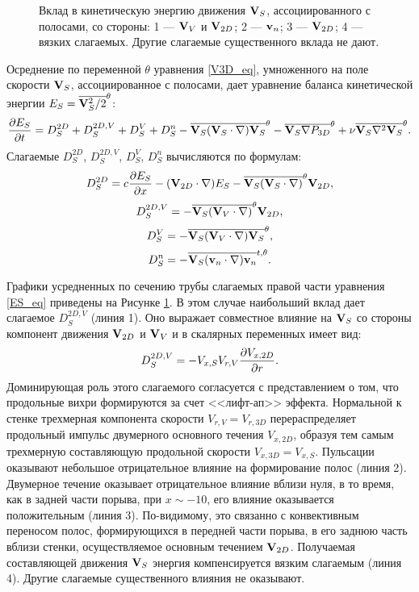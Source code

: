 \begin{figure}
\caption{Вклад в кинетическую энергию движения $\mathbf{V}_S$, ассоциированного с полосами, со стороны: 1 --- $\mathbf{V}_V$ и $\mathbf{V}_{2D}$; 2 --- $\mathbf{v}_n$; 3 --- $\mathbf{V}_{2D}$; 4 --- вязких слагаемых. Другие слагаемые существенного вклада не дают.}
\label{es_parts_pic}
\end{figure}

Осреднение по переменной $\theta$ уравнения \eqref{V3D_eq}, умноженного на поле скорости $\mathbf{V}_S$,  ассоциированное с полосами, дает уравнение баланса кинетической энергии $E_S = \overline{\mathbf{V}_S^2/2}^\theta$:
\begin{equation}\label{ES_eq}
\frac{\partial E_S}{\partial t} = D_S^{2D} + D_S^{2D,V} + D_S^V + D_S^n - \overline{\mathbf{V}_S (\mathbf{V}_S \cdot \nabla) \mathbf{V}_S}^\theta - \overline{\mathbf{V}_S \nabla P_{3D}}^\theta + \nu \overline{\mathbf{V}_S \nabla^2 \mathbf{V}_S}^\theta.
\end{equation} 
Слагаемые $D_S^{2D}$, $D_S^{2D,V}$, $D_S^V$, $D_S^n$ вычисляются по формулам:
$$
D_S^{2D} = c \frac{\partial E_S}{\partial x} - (\mathbf{V}_{2D} \cdot \nabla) E_S - \overline{\mathbf{V}_S (\mathbf{V}_S \cdot \nabla)}^\theta \mathbf{V}_{2D},
$$
$$
D_S^{2D,V} = - \overline{\mathbf{V}_S (\mathbf{V}_V \cdot \nabla)}^\theta \mathbf{V}_{2D},
$$
$$
D_S^{V} = - \overline{\mathbf{V}_S (\mathbf{V}_V \cdot \nabla) \mathbf{V}_S}^\theta,
$$
$$
D_S^n = - \overline{\mathbf{V}_S (\mathbf{v}_n \cdot \nabla) \mathbf{v}_n}^{t,\theta}.
$$

Графики усредненных по сечению трубы слагаемых правой части уравнения \eqref{ES_eq} приведены на Рисунке \ref{es_parts_pic}. В этом случае наибольший вклад дает слагаемое $D_S^{2D,V}$ (линия 1). Оно выражает совместное влияние на $\mathbf{V}_S$ со стороны компонент движения $\mathbf{V}_{2D}$ и $\mathbf{V}_V$ и в скалярных переменных имеет вид:
$$
D_S^{2D,V} =  - V_{x, S} V_{r, V} \frac{\partial V_{x, 2D}}{\partial r}.
$$
Доминирующая роль этого слагаемого согласуется с представлением о том, что продольные вихри формируются за счет <<лифт-ап>> эффекта. Нормальной к стенке трехмерная компонента скорости $V_{r,V} = V_{r,3D}$ перераспределяет продольный импульс двумерного основного течения $V_{x, 2D}$, образуя тем самым трехмерную составляющую продольной скорости $V_{x,3D} = V_{x,S}$. Пульсации оказывают небольшое отрицательное влияние на формирование полос (линия 2). Двумерное течение оказывает отрицательное влияние вблизи нуля, в то время, как в задней части порыва, при $x \sim -10$, его влияние оказывается положительным (линия 3). По-видимому, это связанно с конвективным переносом полос, формирующихся в передней части порыва, в его заднюю часть вблизи стенки, осуществляемое основным течением $\mathbf{V}_{2D}$. Получаемая составляющей движения $\mathbf{V}_S$ энергия компенсируется вязким слагаемым (линия 4). Другие слагаемые существенного влияния не оказывают. 

